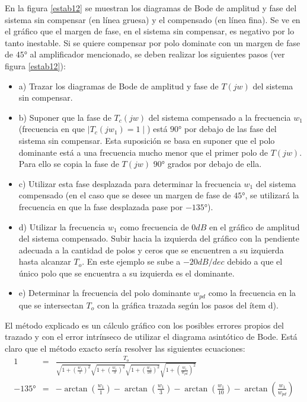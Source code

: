 En la figura \ref{estab12} se muestran los diagramas de Bode de
amplitud y fase del sistema sin compensar (en línea gruesa) y el
compensado (en línea fina). Se ve en el gráfico que el margen de
fase, en el sistema sin compensar, es negativo  por lo tanto
inestable. Si se quiere compensar por polo dominate con un margen de
fase de $45°$ al amplificador mencionado, se deben realizar los
siguientes pasos (ver figura \ref{estab12}):
\begin{itemize}
	\item a) Trazar los diagramas de Bode de amplitud  y fase de
	$T(jw)$ del sistema sin compensar.
	\item b) Suponer que la fase de $T_{c}(jw)$ del sistema compensado a la frecuencia
	$w_1$  (frecuencia en que $\mid T_{c}(jw_1)=1 \mid$) está $90°$ por
	debajo de las fase del sistema sin compensar. Esta suposición se
	basa en suponer que el polo dominante está a una frecuencia mucho
	menor que el primer polo de $T(jw)$. Para ello se copia la fase de
	$T(jw)$ $90°$ grados por debajo de ella.
	\item c) Utilizar esta fase desplazada para determinar la
	frecuencia $w_1$ del sistema compensado (en el caso que se desee
	un margen de fase de $45°$, se utilizará la frecuencia en que la
	fase desplazada pase por $-135°$).
	\item d) Utilizar la frecuencia $w_1$ como frecuencia de $0 dB$
	en el gráfico de amplitud del sistema compensado. Subir hacia la izquierda del gráfico con la pendiente adecuada a
	la cantidad de polos  y ceros que se encuentren a su izquierda hasta alcanzar $T_o$. En este ejemplo se sube a $-20 dB/dec$
	debido a que el único polo que se encuentra a su izquierda es el
	dominante.
	\item e) Determinar la frecuencia del polo dominante $w_{pd}$
	como la frecuencia en la que se intersectan $T_o$ con la gráfica
	trazada según los pasos del ítem d).
\end{itemize}

El método explicado es un cálculo gráfico con los posibles errores
propios del trazado y con el error intrínseco de utilizar el
diagrama asintótico de Bode. Está claro que el método exacto sería
resolver las siguientes ecuaciones:
\begin{eqnarray}
	\nonumber
	1 &=& \frac{\displaystyle T_o}{\displaystyle \sqrt{1+(\frac{\displaystyle w_1}{\displaystyle 1})^2}\sqrt{1+(\frac{\displaystyle w_1}{\displaystyle 3})^2}\sqrt{1+(\frac{\displaystyle w_1}{\displaystyle 10})^2}\sqrt{1+(\frac{\displaystyle w_1}{\displaystyle w_{pd}})^2}}\\
	\nonumber
	-135° &=& -\arctan(\frac{\displaystyle w_1}{\displaystyle 1}) -\arctan(\frac{\displaystyle w_1}{\displaystyle 3}) -\arctan(\frac{\displaystyle w_1}{\displaystyle 10}) -\arctan (\frac{\displaystyle w_1}{\displaystyle w_{pd}})
\end{eqnarray}

